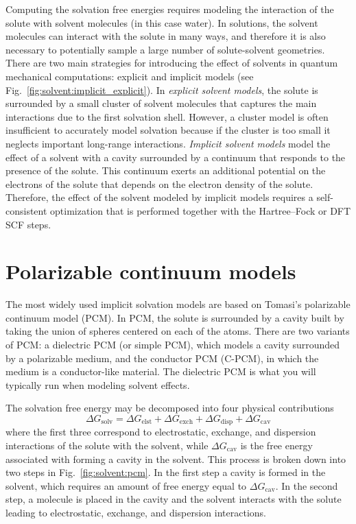 \documentclass[../Main/notes.tex]{subfiles}
\begin{document}
Computing the solvation free energies requires modeling the interaction of the solute with solvent molecules (in this case water).
In solutions, the solvent molecules can interact with the solute in many ways, and therefore it is also necessary to potentially sample a large number of solute-solvent geometries.
There are two main strategies for introducing the effect of solvents in quantum mechanical computations: explicit and implicit models (see Fig.~\ref{fig:solvent:implicit_explicit}).
In \emph{explicit solvent models}, the solute is surrounded by a small cluster of solvent molecules that captures the main interactions due to the first solvation shell.
However, a cluster model is often insufficient to accurately model solvation because if the cluster is too small it neglects important long-range interactions.
\emph{Implicit solvent models} model the effect of a solvent with a cavity surrounded by a continuum that responds to the presence of the solute. This continuum exerts an additional potential on the electrons of the solute that depends on the electron density of the solute.
Therefore, the effect of the solvent modeled by implicit models requires a self-consistent optimization that is performed together with the Hartree--Fock or DFT SCF steps.

\section{Polarizable continuum models}


The most widely used implicit solvation models are based on Tomasi's polarizable continuum model (PCM).
In PCM, the solute is surrounded by a cavity built by taking the union of spheres centered on each of the atoms.
There are two variants of PCM: a dielectric PCM (or simple PCM), which models a cavity surrounded by a polarizable medium, and the conductor PCM (C-PCM), in which the medium is a conductor-like material.
The dielectric PCM is what you will typically run when modeling solvent effects.

The solvation free energy may be decomposed into four physical contributions
\begin{equation}
\Delta G_\mathrm{solv}= \Delta G_\mathrm{elst} + \Delta G_\mathrm{exch} + \Delta G_\mathrm{disp} + \Delta G_\mathrm{cav}
\end{equation}
where the first three correspond to electrostatic, exchange, and dispersion interactions of the solute with the solvent, while $\Delta G_\mathrm{cav}$ is the free energy associated with forming a cavity in the solvent.
This process is broken down into two steps in Fig.~\ref{fig:solvent:pcm}.
In the first step a cavity is formed in the solvent, which requires an amount of free energy equal to $\Delta G_\mathrm{cav}$.
In the second step, a molecule is placed in the cavity and the solvent interacts with the solute leading to electrostatic, exchange, and dispersion interactions.
\end{document}
